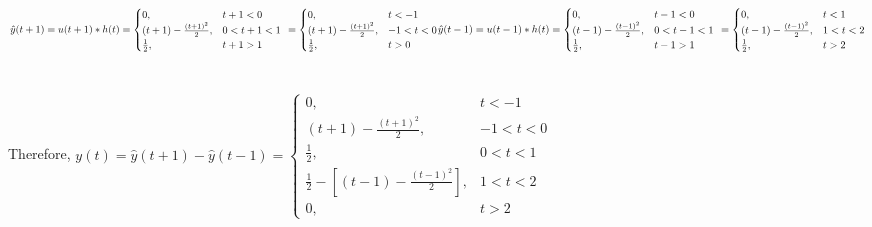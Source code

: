 \documentclass[12pt]{article}
\begin{document}
    \begin{math}
      \resizebox{.9\hsize}{!}{$
      \hat{y}(t+1) = u(t+1)*h(t) = \begin{cases}
      0,& t+1 < 0\\
      (t+1) - \frac{(t+1)^{2}}{2},& 0 < t+1 <1\\
     \frac{1}{2},& t+1 > 1
    \end{cases} \ =  \begin{cases}
      0,& t < -1\\
      (t+1) - \frac{(t+1)^{2}}{2},& -1 < t < 0\\
     \frac{1}{2},& t > 0
    \end{cases}$}  \\ \\ \\
    \resizebox{.9\hsize}{!}{$
    \hat{y}(t-1) = u(t-1)*h(t) = \begin{cases}
      0,& t-1 < 0\\
      (t-1) - \frac{(t-1)^{2}}{2},& 0 < t-1 <1\\
     \frac{1}{2},& t-1 > 1
    \end{cases} \ =  \begin{cases}
      0,& t < 1\\
      (t-1) - \frac{(t-1)^{2}}{2},& 1 < t < 2\\
     \frac{1}{2},& t > 2
    \end{cases}$} \end{math}\\ \\ \\
    Therefore, \begin{math} y(t) = \hat{y}(t+1) - \hat{y}(t-1) =  \begin{cases}
      0,& t < -1\\
      (t+1) - \frac{(t+1)^{2}}{2},& -1 < t < 0\\
     \frac{1}{2},& 0 < t < 1\\
     \frac{1}{2} - [(t-1) - \frac{(t-1)^{2}}{2}],& 1 < t < 2\\
     0,& t > 2
    \end{cases}  \end{math} \\
\end{document}
